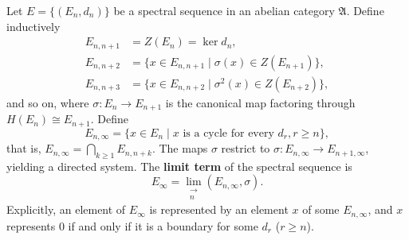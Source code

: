 Let $E = \{(E_n, d_n)\}$ be a spectral sequence in an abelian category $\mathfrak{A}$. Define inductively
\begin{align*}
E_{n,n+1} &= Z(E_n) = \ker d_n, \\
E_{n,n+2} &= \{x \in E_{n,n+1} \mid \sigma(x) \in Z(E_{n+1})\}, \\
E_{n,n+3} &= \{x \in E_{n,n+2} \mid \sigma^2(x) \in Z(E_{n+2})\},
\end{align*}
and so on, where $\sigma: E_n \to E_{n+1}$ is the canonical map factoring through $H(E_n) \cong E_{n+1}$. Define
$$E_{n,\infty} = \{x \in E_n \mid x \text{ is a cycle for every } d_r, r \geq n\},$$
that is, $E_{n,\infty} = \bigcap_{k \geq 1} E_{n,n+k}$. The maps $\sigma$ restrict to $\sigma: E_{n,\infty} \to E_{n+1,\infty}$, yielding a directed system. The \textbf{limit term} of the spectral sequence is
$$E_\infty = \lim_{\substack{\longrightarrow \\ n}} (E_{n,\infty}, \sigma).$$
Explicitly, an element of $E_\infty$ is represented by an element $x$ of some $E_{n,\infty}$, and $x$ represents $0$ if and only if it is a boundary for some $d_r$ ($r \geq n$).
